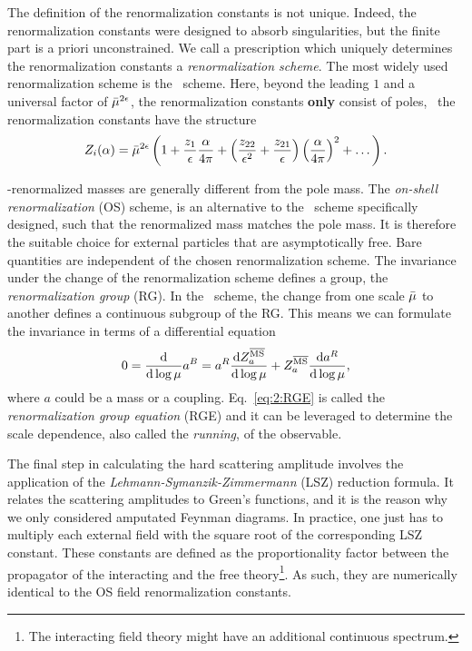 The definition of the renormalization constants is not unique. Indeed, the renormalization constants were designed to absorb singularities, but the finite part is a priori unconstrained. We call a prescription which uniquely determines the renormalization constants a \textit{renormalization scheme}. The most widely used renormalization scheme is the \MS\ scheme. Here, beyond the leading $1$ and a universal factor of $\bar{\mu}^{2\epsilon}$, the renormalization constants \textbf{only} consist of poles, \ie\ the renormalization constants have the structure
\begin{equation}
Z_i(\alpha) = \bar{\mu}^{2\epsilon} \left(1 + \frac{z_1}{\epsilon} \frac{\alpha}{4 \pi} + \left(\frac{z_{22}}{\epsilon^2} + \frac{z_{21}}{\epsilon} \right) \left( \frac{\alpha}{4 \pi} \right)^2 + \dots \right).
\end{equation}

\MS-renormalized masses are generally different from the pole mass. The \textit{on-shell renormalization} (\acs{OS}) scheme, is an alternative to the \MS\ scheme specifically designed, such that the renormalized mass matches the pole mass. It is therefore the suitable choice for external particles that are asymptotically free. Bare quantities are independent of the chosen renormalization scheme. The invariance under the change of the renormalization scheme defines a group, the \textit{renormalization group} (\acs{RG}). In the \MS\ scheme, the change from one scale $\bar{\mu}$ to another defines a continuous subgroup of the \acs{RG}. This means we can formulate the invariance in terms of a differential equation
\begin{equation}
0 = \frac{\mathrm{d}}{\mathrm{d} \log \mu} a^B  = a^R \frac{\mathrm{d} Z^{\overline{\mathrm{MS}}}_a}{\mathrm{d} \log \mu} + Z^{\overline{\mathrm{MS}}}_a \frac{\mathrm{d} a^R}{\mathrm{d} \log \mu},
\label{eq:2:RGE}
\end{equation}
where $a$ could be a mass or a coupling. Eq.~\eqref{eq:2:RGE} is called the \textit{renormalization group equation} (\acs{RGE}) and it can be leveraged to determine the scale dependence, also called the \textit{running}, of the observable.

The final step in calculating the hard scattering amplitude involves the application of the \textit{Lehmann-Symanzik-Zimmermann} (LSZ) reduction formula. It relates the scattering amplitudes to Green's functions, and it is the reason why we only considered amputated Feynman diagrams. In practice, one just has to multiply each external field with the square root of the corresponding LSZ constant. These constants are defined as the proportionality factor between the propagator of the interacting and the free theory\footnote{The interacting field theory might have an additional continuous spectrum.}. As such, they are numerically identical to the \acs{OS} field renormalization constants.

